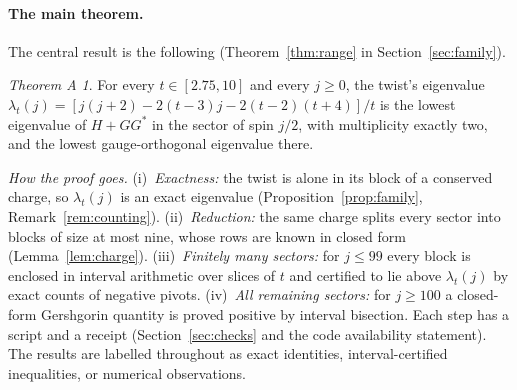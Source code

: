 \documentclass[11pt]{article}
\theoremstyle{definition}
\theoremstyle{remark}
\newtheorem*{mainthm}{Theorem A}
\newif\ifredline
\newcommand{\redins}[1]{\ifredline{\color{blue}#1}\else#1\fi}
\begin{document}
\redins{\paragraph{The main theorem.} The central result is the following (Theorem~\ref{thm:range} in
Section~\ref{sec:family}).

\begin{mainthm}
For every $t\in[2.75,10]$ and every $j\ge0$, the twist's eigenvalue
$\lambda_t(j)=[j(j+2)-2(t-3)j-2(t-2)(t+4)]/t$ is the lowest eigenvalue of $H+GG^*$ in the sector of spin $j/2$, with
multiplicity exactly two, and the lowest gauge-orthogonal eigenvalue there.
\end{mainthm}

\noindent\emph{How the proof goes.} (i)~\emph{Exactness:} the twist is alone in its block of a conserved charge, so
$\lambda_t(j)$ is an exact eigenvalue (Proposition~\ref{prop:family}, Remark~\ref{rem:counting}). (ii)~\emph{Reduction:}
the same charge splits every sector into blocks of size at most nine, whose rows are known in closed form
(Lemma~\ref{lem:charge}). (iii)~\emph{Finitely many sectors:} for $j\le99$ every block is enclosed in interval
arithmetic over slices of $t$ and certified to lie above $\lambda_t(j)$ by exact counts of negative pivots.
(iv)~\emph{All remaining sectors:} for $j\ge100$ a closed-form Gershgorin quantity is proved positive by interval
bisection. Each step has a script and a receipt (Section~\ref{sec:checks} and the code availability statement). The
results are labelled throughout as exact identities, interval-certified inequalities, or numerical observations.}
\end{document}
